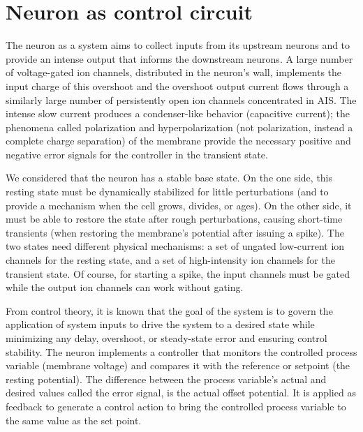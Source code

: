 

\section[Control circuit]{Neuron as control circuit\label{sec:Single-NeuronControlCircle}}

The neuron as a system aims to collect inputs from its upstream neurons and to provide an intense output that informs the downstream neurons.
A large number of voltage-gated ion channels, distributed in the neuron's wall, implements the input charge of this overshoot
and the overshoot output current flows through a similarly large number of persistently open ion channels concentrated in 
\gls{AIS}.
The intense slow current produces a condenser-like behavior (capacitive current); the phenomena called polarization and hyperpolarization (not polarization, instead a complete charge separation) of the membrane provide the necessary positive and negative error signals for the controller in the transient state.

We considered that the neuron has a stable base state. On the one side, this resting state must be dynamically stabilized for little perturbations
(and to provide a mechanism when the cell grows, divides, or ages). On the other side, it must be able to restore the state after rough perturbations, causing short-time transients (when restoring the
membrane's potential after issuing a spike). The two states need different physical mechanisms: a set of ungated low-current ion channels 
for the resting state, and a set of high-intensity ion channels 
for the transient state. Of course, for starting a spike, the input channels must be gated while the output ion channels can work without gating. 


From \hypertarget{ControlTheory}{control theory}, it is known that the goal of the system is to
govern the application of system inputs to drive the system to a desired state while minimizing any delay, overshoot, or steady-state error and ensuring control stability.
The neuron implements a controller that monitors the controlled process variable (membrane voltage) and compares it with the reference or setpoint (the resting potential).
The difference between the process variable's actual and desired values called the error signal, is the actual offset potential.
It is applied as feedback to generate a control action to bring the controlled process variable to the same value as the set point.

